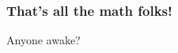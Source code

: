 \documentclass[36pt,handout]{beamer}
\begin{document}
{
\begin{frame}[t]
\frametitle{That's all the math folks!}
Anyone awake?
\end{frame}
}
\end{document}
